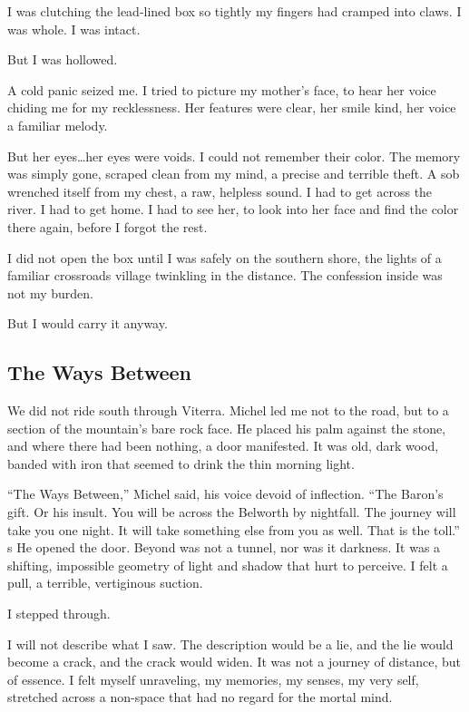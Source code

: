 \documentclass[11pt]{article}
\begin{document}
I was clutching the lead-lined box so tightly my fingers had cramped into claws. I was whole. I was intact.

But I was hollowed.

A cold panic seized me. I tried to picture my mother's face, to hear her voice chiding me for my recklessness. Her features were clear, her smile kind, her voice a familiar melody.

But her eyes\dots her eyes were voids. I could not remember their color. The memory was simply gone, scraped clean from my mind, a precise and terrible theft. A sob wrenched itself from my chest, a raw, helpless sound. I had to get across the river. I had to get home. I had to see her, to look into her face and find the color there again, before I forgot the rest.

I did not open the box until I was safely on the southern shore, the lights of a familiar crossroads village twinkling in the distance. The confession inside was not my burden.

But I would carry it anyway.

\newpage

\subsection*{The Ways Between}

We did not ride south through Viterra. Michel led me not to the road, but to a section of the mountain's bare rock face. He placed his palm against the stone, and where there had been nothing, a door manifested. It was old, dark wood, banded with iron that seemed to drink the thin morning light.

``The Ways Between,'' Michel said, his voice devoid of inflection. ``The Baron's gift. Or his insult. You will be across the Belworth by nightfall. The journey will take you one night. It will take something else from you as well. That is the toll.''
s
He opened the door. Beyond was not a tunnel, nor was it darkness. It was a shifting, impossible geometry of light and shadow that hurt to perceive. I felt a pull, a terrible, vertiginous suction.

I stepped through.

I will not describe what I saw. The description would be a lie, and the lie would become a crack, and the crack would widen. It was not a journey of distance, but of essence. I felt myself unraveling, my memories, my senses, my very self, stretched across a non-space that had no regard for the mortal mind.
\end{document}
